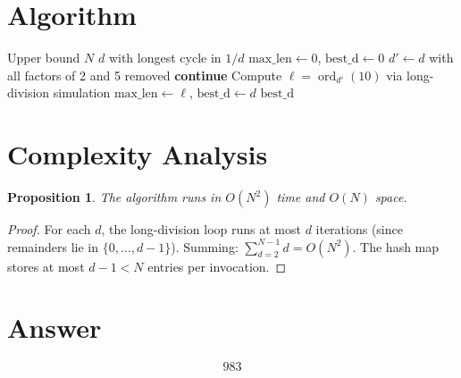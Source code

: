 \documentclass[12pt,a4paper]{article}
\newtheorem{proposition}[theorem]{Proposition}
\theoremstyle{definition}
\begin{document}
\section{Algorithm}

\begin{algorithm}[H]
\caption{Find $d < N$ with Longest Reciprocal Cycle}
\begin{algorithmic}[1]
\REQUIRE Upper bound $N$
\ENSURE $d$ with longest cycle in $1/d$
\STATE $\text{max\_len} \gets 0$, $\text{best\_d} \gets 0$
    \STATE $d' \gets d$ with all factors of 2 and 5 removed
        \STATE \textbf{continue}
    \ENDIF
    \STATE Compute $\ell = \operatorname{ord}_{d'}(10)$ via long-division simulation
        \STATE $\text{max\_len} \gets \ell$, $\text{best\_d} \gets d$
    \ENDIF
\ENDFOR
\RETURN $\text{best\_d}$
\end{algorithmic}
\end{algorithm}

\section{Complexity Analysis}

\begin{proposition}
The algorithm runs in $O(N^2)$ time and $O(N)$ space.
\end{proposition}

\begin{proof}
For each $d$, the long-division loop runs at most $d$ iterations (since remainders lie in $\{0, \ldots, d-1\}$). Summing: $\sum_{d=2}^{N-1} d = O(N^2)$. The hash map stores at most $d - 1 < N$ entries per invocation.
\end{proof}

\section{Answer}

\[
\boxed{983}
\]
\end{document}
